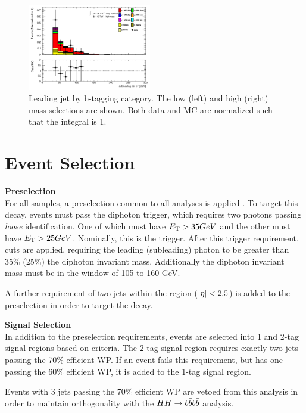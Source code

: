 \begin{figure}[htbp]
  \includegraphics[width=0.48\textwidth]{chapters/chapter5_yybb/images/data_MC_comparison/h_SR_h_2t_nominal_subleadingJet_pt.pdf}
  \caption[Subleading jet \pt.]{Leading jet \pt by b-tagging category. The low (left) and high (right) mass selections are shown. Both data and MC are normalized such that the integral is 1.
  \label{fig:jet_s_pt}}
\end{figure}



\section{Event Selection}
\noindent\textbf{Preselection}\\
\indent For all samples, a preselection common to all \Hgg analyses is applied \cite{hgam-preselection}. To target this decay, events must pass the diphoton trigger, which requires two photons passing \textit{loose} identification. One of which must have $\et > \unit{35}{GeV}$ and the other must have $\et > \unit{25}{GeV}$. Nominally, this is the  trigger. After this trigger requirement, \pt cuts are applied, requiring the leading (subleading) photon \pt to be greater than 35\% (25\%) the diphoton invariant mass. Additionally the diphoton invariant mass must be in the window of 105 to 160 GeV.

A further requirement of two jets within the \btagging region ($|\eta| <2.5$) is added to the preselection in order to target the \Hbb decay.

\noindent\textbf{Signal Selection}\\
\indent In addition to the preselection requirements, events are selected into 1 and 2-tag signal regions based on \btagging criteria. The 2-tag signal region requires exactly two jets passing the 70\% efficient \btagging \gls{WP}. If an event fails this requirement, but has one \bjet passing the 60\% efficient \btagging \gls{WP}, it is added to the 1-tag signal region.

Events with 3 jets passing the 70\% efficient \btagging \gls{WP} are vetoed from this analysis in order to maintain orthogonality with the $HH \rightarrow b\bar{b} b\bar{b}$ analysis.


